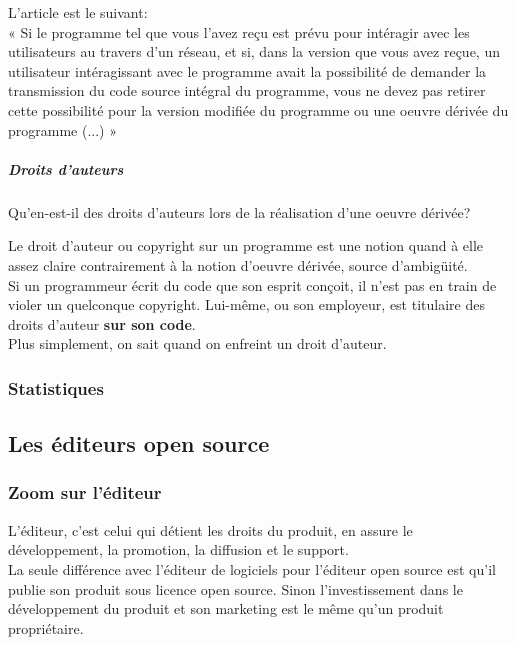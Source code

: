 				L'article est le suivant:\\

				« Si le programme tel que vous l'avez reçu est prévu pour intéragir avec les utilisateurs au travers d'un réseau, et si, dans la version que vous avez reçue, un  utilisateur intéragissant avec le programme avait la possibilité de demander la transmission du code source intégral du programme, vous ne devez pas retirer cette possibilité pour la version modifiée du programme ou une oeuvre dérivée du programme (...) »

				\subparagraph{Droits d'auteurs\\}

				Qu'en-est-il des droits d'auteurs lors de la réalisation d'une oeuvre dérivée?

				Le droit d'auteur ou copyright sur un programme est une notion quand à elle assez claire contrairement à la notion d'oeuvre dérivée, source d'ambigüité.\\

				Si un programmeur écrit du code que son esprit conçoit, il n'est pas en train de violer un quelconque copyright. Lui-même, ou son employeur, est titulaire des droits d'auteur \textbf{sur son code}.\\
				Plus simplement, on sait quand on enfreint un droit d'auteur.

			\subsubsection{Statistiques}			

		\subsection{Les éditeurs open source}

			\subsubsection{Zoom sur l'éditeur}

			L'éditeur, c'est celui qui détient les droits du produit, en assure le développement, la promotion, la diffusion et le support.\\
			
			La seule différence avec l'éditeur de logiciels pour l'éditeur open source est qu'il publie son produit sous licence open source. Sinon l'investissement dans le développement du produit et son marketing est le même qu'un produit propriétaire.

